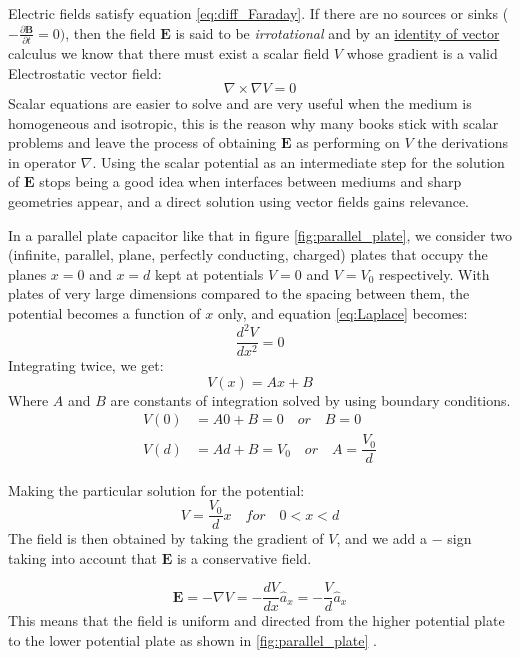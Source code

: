 Electric fields satisfy equation \ref{eq:diff_Faraday}. If there are no sources or sinks ($- \frac{\partial \mathbf{B}}{\partial t}=0)$, then the field $\mathbf{E}$ is said to be \textit{irrotational} and by an \href{http://ebooksgo.org/mathematics/Vector_Identity.pdf}{identity of vector} calculus we know that there must exist a scalar field $V$ whose gradient is a valid Electrostatic vector field:
\begin{equation}
\nabla\times\nabla V = 0
\label{eq:Laplace}
\end{equation}
Scalar equations are easier to solve and are very useful when the medium is homogeneous and isotropic, this is the reason why many books stick with scalar problems and leave the process of obtaining $\mathbf{E}$ as performing on $V$ the derivations in operator $\nabla$. Using the scalar potential as an intermediate step for the solution of $\mathbf{E}$ stops being a good idea when interfaces between mediums and sharp geometries appear, and a direct solution using vector fields gains relevance.

In a parallel plate capacitor like that in figure \ref{fig:parallel_plate}, we consider two (infinite, parallel, plane, perfectly conducting, charged) plates that occupy the planes $x = 0$ and $x = d$ kept at potentials $V = 0$ and $V = V_0$ respectively.  
With plates of very large dimensions compared to the spacing between them, the potential becomes a function of $x$ only, and equation \ref{eq:Laplace} becomes:
$$\dfrac{d^2V}{d x^2}=0$$ Integrating twice, we get: 
\begin{equation}
V(x) = Ax + B
\end{equation}
Where $A$  and $B$ are constants of integration solved by using boundary conditions.
\begin{align*}
V(0) &= A0 + B = 0 \quad or \quad B = 0\\
V(d) &= Ad + B = V_0 \quad or \quad A = \dfrac{V_0}{d}
\end{align*}

Making the particular solution for the potential:
$$V=\dfrac{V_0}{d}x \quad for \quad 0<x<d$$ 
The field is then obtained by taking the gradient of $V$, and we add a $-$ sign taking into account that $\mathbf{E}$ is a conservative field.

\begin{equation}
\mathbf{E}= -\nabla V = - \dfrac{dV}{dx}\hat{a}_x = -\dfrac{V}{d}\hat{a}_x
\end{equation}
This means that the field is uniform and directed from the higher potential plate to the lower potential plate as shown in \ref{fig:parallel_plate} \cite{Rao2004}.

